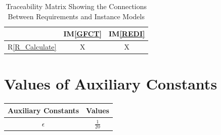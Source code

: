 \documentclass[12pt]{article}
\newcommand{\iref}[1]{IM\ref{#1}}
\newcommand{\rref}[1]{R\ref{#1}}
\begin{document}
\begin{table}[h!]
\centering
\begin{tabular}{|c|c|c|}
\hline
	& \iref{GFCT} & \iref{REDI} \\
\hline
\rref{R_Calculate}   & X & X \\ 
\hline
\end{tabular}
\caption{Traceability Matrix Showing the Connections Between Requirements and Instance Models}
\label{Table:R_trace}
\end{table}

\section{Values of Auxiliary Constants}

\begin{table}[h!]
  \centering
  \begin{tabular}{|c|c|}
  \hline
  Auxiliary Constants & Values \\
  \hline
  $\epsilon$  & $\frac{1}{20}$ \\ 
  \hline
  \end{tabular}
  \label{Table:Values}
  \end{table}
\end{document}
